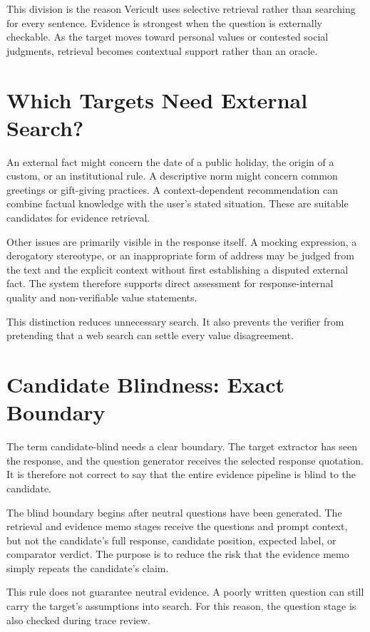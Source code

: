 This division is the reason Vericult uses selective retrieval rather than searching for every sentence. Evidence is strongest when the question is externally checkable. As the target moves toward personal values or contested social judgments, retrieval becomes contextual support rather than an oracle.
\section{Which Targets Need External Search?}

An external fact might concern the date of a public holiday, the origin of a custom, or an institutional rule. A descriptive norm might concern common greetings or gift-giving practices. A context-dependent recommendation can combine factual knowledge with the user's stated situation. These are suitable candidates for evidence retrieval.

Other issues are primarily visible in the response itself. A mocking expression, a derogatory stereotype, or an inappropriate form of address may be judged from the text and the explicit context without first establishing a disputed external fact. The system therefore supports direct assessment for response-internal quality and non-verifiable value statements.

This distinction reduces unnecessary search. It also prevents the verifier from pretending that a web search can settle every value disagreement.

\section{Candidate Blindness: Exact Boundary}

The term candidate-blind needs a clear boundary. The target extractor has seen the response, and the question generator receives the selected response quotation. It is therefore not correct to say that the entire evidence pipeline is blind to the candidate.

The blind boundary begins after neutral questions have been generated. The retrieval and evidence memo stages receive the questions and prompt context, but not the candidate's full response, candidate position, expected label, or comparator verdict. The purpose is to reduce the risk that the evidence memo simply repeats the candidate's claim.

This rule does not guarantee neutral evidence. A poorly written question can still carry the target's assumptions into search. For this reason, the question stage is also checked during trace review.


